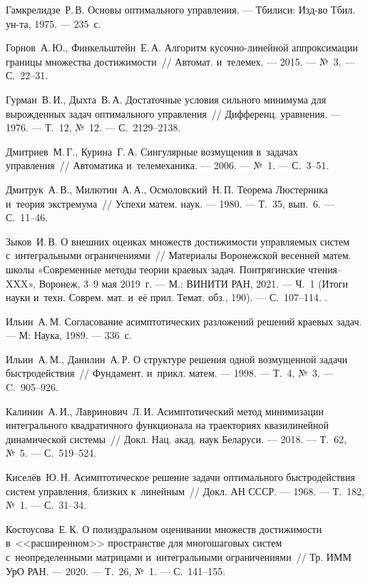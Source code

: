 \documentclass[../main.tex]{subfiles}
\begin{document}
\begin{thebibliography}{99}
Гамкрелидзе~Р.\,В. Основы оптимального управления. --- Тбилиси: Изд-во Тбил. ун-та, 1975. --- 235~с.

Горнов~А.\,Ю., Финкельштейн~Е.\,А. Алгоритм кусочно-линейной аппроксимации границы множества достижимости~// Автомат. и~телемех. --- 2015. --- №~3. --- С.~22--31.

Гурман~В.\,И., Дыхта~В.\,А. Достаточные условия сильного минимума для вырожденных задач оптимального управления~// Дифференц. уравнения. --- 1976. --- Т.~12, №~12. --- С.~2129--2138.

Дмитриев~М.\,Г., Курина~Г.\,А. Сингулярные возмущения в~задачах управления~// Автоматика и~телемеханика. --- 2006. --- №~1. --- С.~3--51.

Дмитрук~А.\,В., Милютин~А.\,А., Осмоловский~Н.\,П. Теорема Люстерника и~теория экстремума~// Успехи матем. наук. --- 1980. --- Т.~35, вып.~6. --- С.~11--46.

Зыков~И.\,В. О внешних оценках множеств достижимости управляемых систем с~интегральными ограничениями~// Материалы Воронежской весенней матем. школы «Современные методы теории краевых задач. Понтрягинские чтения–XXX», Воронеж, 3--9 мая 2019~г. --- М.: ВИНИТИ РАН, 2021. --- Ч.~1 (Итоги науки и~техн. Соврем. мат. и~её прил. Темат. обз., 190). --- С.~107--114. .

Ильин~А.\,М. Согласование асимптотических разложений решений краевых задач. --- М: Наука, 1989. --- 336~с.

Ильин~А.\,М., Данилин~А.\,Р. О структуре решения одной возмущенной задачи быстродействия~// Фундамент. и~прикл. матем. --- 1998. --- Т.~4, №~3. --- C.~905--926.

Калинин~А.\,И., Лавринович~Л.\,И. Асимптотический метод минимизации интегрального квадратичного функционала на траекториях квазилинейной динамической системы~// Докл. Нац. акад. наук Беларуси. --- 2018. --- Т.~62, №~5. --- С.~519--524. 

Киселёв~Ю.\,Н. Асимптотическое решение задачи оптимального быстродействия систем управления, близких к~линейным~// Докл. АН СССР. --- 1968. --- Т.~182, №~1. --- С.~31--34.

Костоусова~Е.\,К. О полиэдральном оценивании множеств достижимости в~<<расширенном>> пространстве для многошаговых систем с~неопределенными матрицами и~интегральными ограничениями~// Тр. ИММ УрО РАН. --- 2020. --- Т.~26, №~1. --- С.~141--155.


\end{thebibliography}
\end{document}
